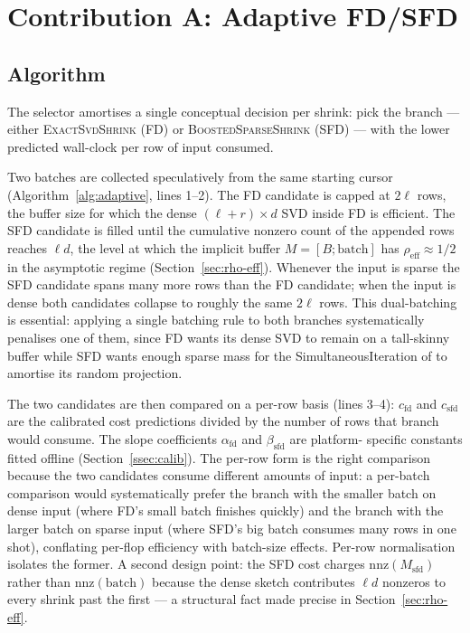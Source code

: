 \documentclass[11pt]{article}
\begin{document}
\section{Contribution A: Adaptive FD/SFD}
\label{sec:adaptive}

\subsection{Algorithm}
\label{ssec:adaptive-algo}

The selector amortises a single conceptual decision per shrink: pick the
branch --- either \textsc{ExactSvdShrink} (FD) or \textsc{BoostedSparseShrink}
(SFD) --- with the lower predicted wall-clock per row of input consumed.

Two batches are collected speculatively from the same starting cursor
(Algorithm~\ref{alg:adaptive}, lines 1--2). The FD candidate is capped at
$2\ell$ rows, the buffer size for which the dense $(\ell + r) \times d$ SVD
inside FD is efficient. The SFD candidate is filled until the cumulative
nonzero count of the appended rows reaches $\ell d$, the level at which the
implicit buffer $M = [B; \mathrm{batch}]$ has $\rho_{\mathrm{eff}} \approx
1/2$ in the asymptotic regime (Section~\ref{sec:rho-eff}). Whenever the
input is sparse the SFD candidate spans many more rows than the FD candidate;
when the input is dense both candidates collapse to roughly the same $2\ell$
rows. This dual-batching is essential: applying a single batching rule to
both branches systematically penalises one of them, since FD wants its dense
SVD to remain on a tall-skinny buffer while SFD wants enough sparse mass for
the SimultaneousIteration of \cite{halko2011randomsvd} to amortise its random
projection.

The two candidates are then compared on a per-row basis (lines 3--4):
$c_{\mathrm{fd}}$ and $c_{\mathrm{sfd}}$ are the calibrated cost predictions
divided by the number of rows that branch would consume. The slope
coefficients $\alpha_{\mathrm{fd}}$ and $\beta_{\mathrm{sfd}}$ are platform-
specific constants fitted offline (Section~\ref{ssec:calib}). The per-row
form is the right comparison because the two candidates consume different
amounts of input: a per-batch comparison would systematically prefer the
branch with the smaller batch on dense input (where FD's small batch
finishes quickly) and the branch with the larger batch on sparse input
(where SFD's big batch consumes many rows in one shot), conflating per-flop
efficiency with batch-size effects. Per-row normalisation isolates the
former. A second design point: the SFD cost charges
$\mathrm{nnz}(M_{\mathrm{sfd}})$ rather than $\mathrm{nnz}(\mathrm{batch})$
because the dense sketch contributes $\ell d$ nonzeros to every shrink past
the first --- a structural fact made precise in Section~\ref{sec:rho-eff}.
\end{document}
